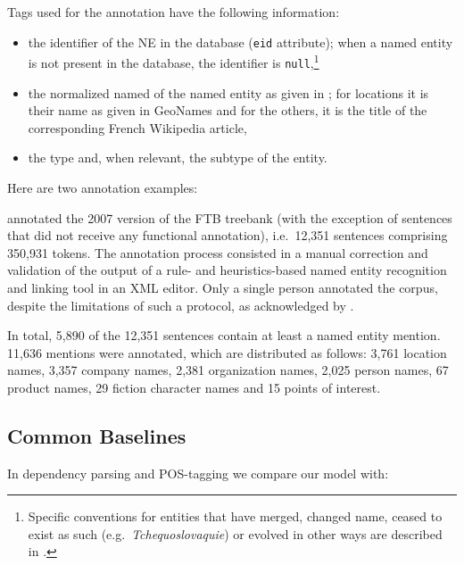 Tags used for the annotation have the following information:
\begin{itemize}
    \item the identifier of the NE in the \aleda database (\texttt{eid} attribute); when a named entity is not present in the database, the identifier is \texttt{null},\footnote{Specific conventions for entities that have merged, changed name, ceased to exist as such (e.g.~\emph{Tchequoslovaquie}) or evolved in other ways are described in \citet{sagot-etal-2012-annotation}.}
    \item the normalized named of the named entity as given in \aleda; for locations it is their name as given in GeoNames and for the others, it is the title of the corresponding French Wikipedia article,
    \item the type and, when relevant, the subtype of the entity.
\end{itemize}
Here are two annotation examples:\\

\citet{sagot-etal-2012-annotation} annotated the 2007 version of the FTB treebank (with the exception of sentences that did not receive any functional annotation), i.e.~12,351 sentences comprising 350,931 tokens. The annotation process consisted in a manual correction and validation of the output of a rule- and heuristics-based named entity recognition and linking tool in an XML editor.
Only a single person annotated the corpus, despite the limitations of such a protocol, as acknowledged by \citet{sagot-etal-2012-annotation}.

In total, 5,890 of the 12,351 sentences contain at least a named entity mention. 11,636 mentions were annotated, which are distributed as follows: 3,761 location names, 3,357 company names, 2,381 organization names, 2,025 person names, 67 product names, 29 fiction character names and 15 points of interest.


\subsection{Common Baselines}
In dependency parsing and POS-tagging we compare our model with:

